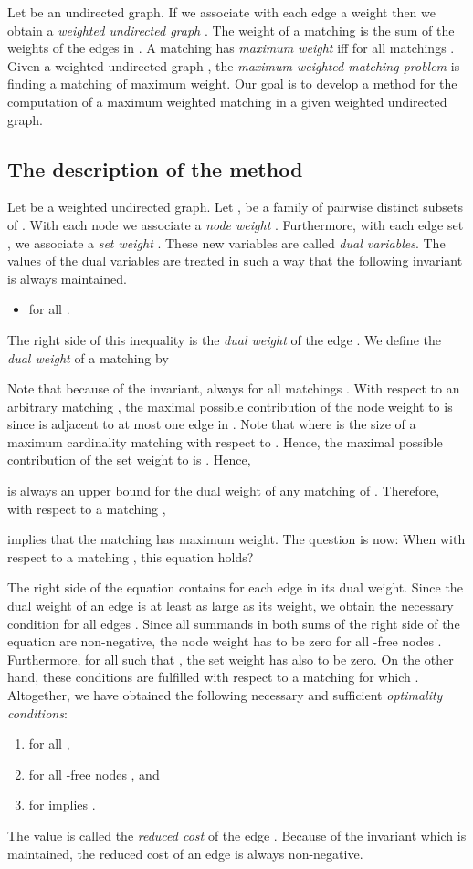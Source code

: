 \documentclass[12pt,twoside,a4paper]{article}
\begin{document}
Let  be an undirected graph. 
If we associate with each edge  a weight  then we
obtain a {\em weighted undirected graph\/} .
The weight  of a matching  is the sum of the weights of the edges in
. A matching  has {\em maximum weight\/} iff   for all matchings
.
Given a weighted undirected graph , the {\em maximum weighted
matching problem\/} is finding a matching  of maximum weight.
Our goal is to develop a method for the computation of a maximum weighted 
matching in a given weighted undirected graph.

\subsection{The description of the method}

Let  be a weighted undirected graph. Let ,  be a family of pairwise distinct subsets of 
. With each node  we associate a {\em node weight\/} . Furthermore, with each edge set , we associate a 
{\em set weight\/} . These new variables are called {\em dual 
variables}.
The values of the dual variables are treated in such a way that the following 
invariant is always maintained.
\begin{itemize}
\item
 for all .
\end{itemize}
The right side of this inequality is the {\em dual weight } of
the edge .
We define the {\em dual weight } of a matching  by

Note that because of the invariant, always  for all matchings 
.  
With respect to an arbitrary matching , the maximal possible 
contribution of the node weight  to  is  since  is 
adjacent to at most one edge in . Note that  where
 is the size of a maximum cardinality matching with respect to . 
Hence, the maximal possible contribution of the set weight  to  is
. Hence,

is always an upper bound for the dual weight of any matching of .
Therefore, with respect to a matching , 
 
implies that the matching  has maximum weight.
The question is now: When with respect to a matching , this equation holds?

The right side of the equation contains for each edge in  its dual weight.
Since the dual weight of an edge is at least as large as its weight, we obtain 
the necessary condition  for all edges .
Since all summands in both sums of the right side of the equation are non-negative, 
the node weight  has to be zero for all -free nodes .
Furthermore, for all  such that , the set weight
 has also to be zero. On the other hand, these conditions are fulfilled with
respect to a matching  for which . Altogether, we have obtained the 
following necessary and sufficient {\em optimality conditions\/}:
\begin{enumerate}
\item
 for all ,
\item
 for all -free nodes , and
\item 
 for  implies .
\end{enumerate}
The value  is called the {\em reduced cost\/} of the edge . Because of
the invariant which is maintained, the reduced cost of an edge is always non-negative.
\end{document}
